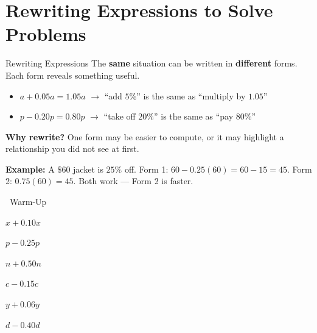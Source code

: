 \section{Rewriting Expressions to Solve Problems}

\begin{quickReview}{Rewriting Expressions}
The \textbf{same} situation can be written in \textbf{different} forms. Each form reveals something useful.

\begin{itemize}[leftmargin=*]
    \item $a + 0.05a = 1.05a$ $\to$ ``add $5\%$'' is the same as ``multiply by $1.05$''
    \item $p - 0.20p = 0.80p$ $\to$ ``take off $20\%$'' is the same as ``pay $80\%$''
\end{itemize}

\medskip
\textbf{Why rewrite?} One form may be easier to compute, or it may highlight a relationship you did not see at first.

\smallskip
\textbf{Example:} A $\$60$ jacket is $25\%$ off. \quad Form 1: $60 - 0.25(60) = 60 - 15 = 45$. \quad Form 2: $0.75(60) = 45$. Both work — Form 2 is faster.
\end{quickReview}

\begin{practiceBox}[funGreen]{\faSun~Warm-Up}


\begin{multicols}{2}
\prob $x + 0.10x$ \answerBlank[3cm]

\prob $p - 0.25p$ \answerBlank[3cm]

\prob $n + 0.50n$ \answerBlank[3cm]

\prob $c - 0.15c$ \answerBlank[3cm]

\prob $y + 0.06y$ \answerBlank[3cm]

\prob $d - 0.40d$ \answerBlank[3cm]
\end{multicols}
\end{practiceBox}


